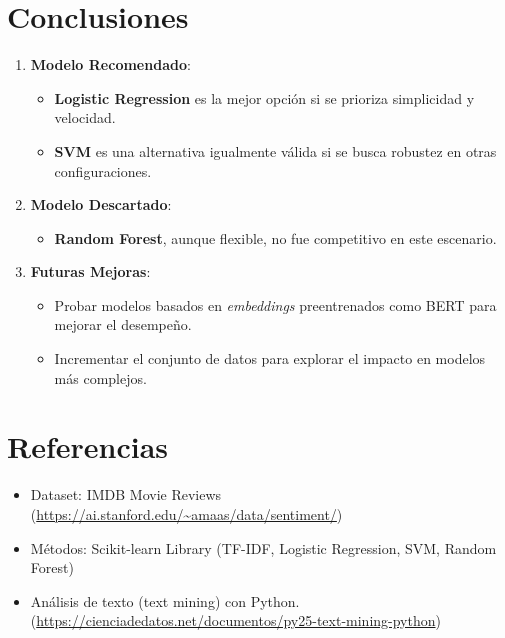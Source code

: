 \documentclass[conference]{IEEEtran}
\begin{document}
\FloatBarrier


\section{Conclusiones}

\begin{enumerate}
    \item \textbf{Modelo Recomendado}:
    \begin{itemize}
        \item \textbf{Logistic Regression} es la mejor opción si se prioriza simplicidad y velocidad.
        \item \textbf{SVM} es una alternativa igualmente válida si se busca robustez en otras configuraciones.
    \end{itemize}
    
    \item \textbf{Modelo Descartado}:
    \begin{itemize}
        \item \textbf{Random Forest}, aunque flexible, no fue competitivo en este escenario.
    \end{itemize}
    
    \item \textbf{Futuras Mejoras}:
    \begin{itemize}
        \item Probar modelos basados en \textit{embeddings} preentrenados como BERT para mejorar el desempeño.
        \item Incrementar el conjunto de datos para explorar el impacto en modelos más complejos.
    \end{itemize}
\end{enumerate}


\section*{Referencias}

\begin{itemize}
    \item Dataset: IMDB Movie Reviews (\url{https://ai.stanford.edu/~amaas/data/sentiment/})

    \item Métodos: Scikit-learn Library (TF-IDF, Logistic Regression, SVM, Random Forest)

    \item Análisis de texto (text mining) con Python. (\url{https://cienciadedatos.net/documentos/py25-text-mining-python}) 
\end{itemize}
\end{document}
